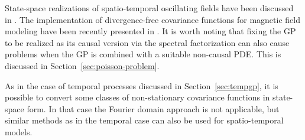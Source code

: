 \documentclass[journal]{IEEEtran}
\begin{document}
State-space realizations of spatio-temporal oscillating fields have been discussed in \cite{Solin+Sarkka:2013}. The implementation of divergence-free covariance functions for magnetic field modeling have been recently presented in \cite{Solin:2017}. It is worth noting that fixing the GP to be realized as its causal version via the spectral factorization can also cause problems when the GP is combined with a suitable non-causal PDE. This is discussed in Section~\ref{sec:poisson-problem}.

As in the case of temporal processes discussed in Section~\ref{sec:tempgp}, it is possible to convert some classes of non-stationary covariance functions in state-space form. In that case the Fourier domain approach is not applicable, but similar methods as in the temporal case can also be used for spatio-temporal models.
\end{document}
